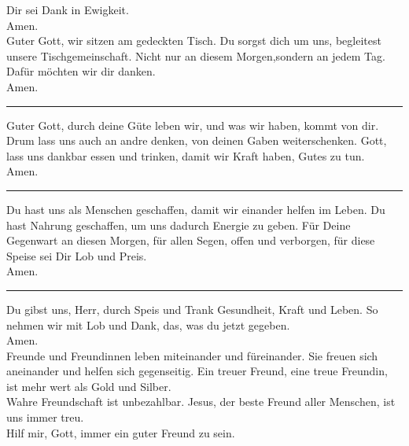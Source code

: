 Dir sei Dank in Ewigkeit.\\ \newline
Amen.\\
\newpage
Guter Gott, wir sitzen am gedeckten Tisch. Du sorgst dich um uns, begleitest unsere Tischgemeinschaft. Nicht nur an diesem Morgen,sondern an jedem Tag. Dafür möchten wir dir danken.\\ \newline
Amen.\\
\par\noindent\rule{\textwidth}{0.4pt} \newline \newline
Guter Gott, durch deine Güte leben wir, und was wir haben, kommt von dir. Drum lass uns auch an andre denken, von deinen Gaben weiterschenken. Gott, lass uns dankbar essen und trinken, damit wir Kraft haben, Gutes zu tun.\\ \newline
Amen.\\
\par\noindent\rule{\textwidth}{0.4pt} \newline \newline
Du hast uns als Menschen geschaffen, damit wir einander helfen im Leben.  Du hast Nahrung geschaffen, um uns dadurch Energie zu geben.   Für Deine Gegenwart an diesen Morgen, für allen Segen, offen und verborgen, für diese Speise sei Dir Lob und Preis.\\ \newline
Amen.\\
\par\noindent\rule{\textwidth}{0.4pt} \newline \newline
Du gibst uns, Herr, durch Speis und Trank Gesundheit, Kraft und Leben.  So nehmen wir mit Lob und Dank, das, was du jetzt gegeben. \\ \newline
Amen.\\
Freunde und Freundinnen leben miteinander und füreinander.  Sie  freuen  sich  aneinander  und  helfen  sich  gegenseitig.  Ein  treuer  Freund,  eine  treue Freundin, ist mehr wert als Gold und Silber.\\ \newline
Wahre  Freundschaft  ist  unbezahlbar.  Jesus,  der  beste  Freund  aller  Menschen,  ist  uns immer treu. \\
Hilf mir, Gott, immer ein guter Freund zu sein.\\ \newline
